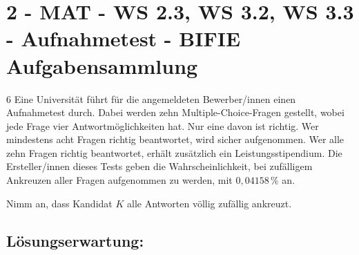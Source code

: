 \section{2 - MAT - WS 2.3, WS 3.2, WS 3.3 - Aufnahmetest - BIFIE Aufgabensammlung}

\begin{langesbeispiel} \item[6] %
Eine Universität führt für die angemeldeten Bewerber/innen einen Aufnahmetest durch. Dabei werden zehn Multiple-Choice-Fragen gestellt, wobei jede Frage vier Antwortmöglichkeiten hat.
Nur eine davon ist richtig. Wer mindestens acht Fragen richtig beantwortet, wird sicher aufgenommen. Wer alle zehn Fragen richtig beantwortet, erhält zusätzlich ein Leistungsstipendium.
Die Ersteller/innen dieses Tests geben die Wahrscheinlichkeit, bei zufälligem Ankreuzen aller Fragen aufgenommen zu werden, mit $0,04158\,\%$ an. 

Nimm an, dass Kandidat $K$ alle Antworten völlig zufällig ankreuzt.%

\begin{aufgabenstellung}
\item %


\item



\end{aufgabenstellung}

\begin{loesung}
\item \subsection{Lösungserwartung:} 

\end{loesung}
\end{langesbeispiel}
